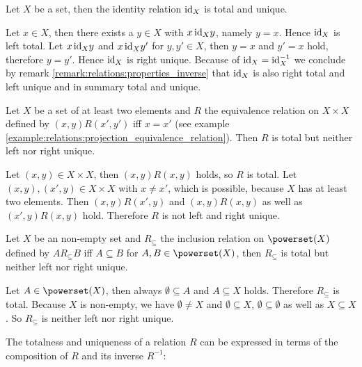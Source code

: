 \begin{examples}
    \begin{exampleenumerate}
        \item\label{example:relations:identity_relation_unique_total} Let $X$ be a set, then the identity relation $\text{id}_X$ is total and unique.
        \begin{miniproof}
            Let $x\in X$, then there exists a $y\in X$ with $x\,\text{id}_X y$, namely $y=x$. Hence $\text{id}_X$ is left total. Let $x\,\text{id}_X y$ and $x\,\text{id}_X y'$ for $y,y'\in X$, then $y=x$ and $y'=x$ hold, therefore $y=y'$. Hence $\text{id}_X$ is right unique. Because of $\text{id}_X=\text{id}_X^{-1}$ we conclude by remark \ref{remark:relations:properties_inverse} that $\text{id}_X$ is also right total and left unique and in summary total and unique.
        \end{miniproof}
        \item Let $X$ be a set of at least two elements and $R$ the equivalence relation on $X\times X$ defined by $(x,y)R(x',y')$ iff $x=x'$ (see example \ref{example:relations:projection_equivalence_relation}). Then $R$ is total but neither left nor right unique.
        \begin{miniproof}
            Let $(x,y)\in X\times X$, then $(x,y)R(x,y)$ holds, so $R$ is total. Let $(x,y),(x',y)\in X\times X$ with $x\neq x'$, which is possible, because $X$ has at least two elements. Then $(x,y)R(x',y)$ and $(x,y)R(x,y)$ as well as $(x',y)R(x,y)$ hold. Therefore $R$ is not left and right unique.
        \end{miniproof}
        \item Let $X$ be an non-empty set and $R_\subseteq$ the inclusion relation on $\powerset(X)$ defined by $A R_\subseteq B$ iff $A\subseteq B$ for $A,B\in\powerset(X)$, then $R_\subseteq$ is total but neither left nor right unique.
        \begin{miniproof}
            Let $A\in\powerset(X)$, then always $\emptyset\subseteq A$ and $A\subseteq X$ holds. Therefore $R_\subseteq$ is total. Because $X$ is non-empty, we have $\emptyset\neq X$ and $\emptyset\subseteq X$, $\emptyset\subseteq \emptyset$ as well as $X\subseteq X$. So $R_\subseteq$ is neither left nor right unique.
        \end{miniproof}
    \end{exampleenumerate}
\end{examples}

The totalness and uniqueness of a relation $R$ can be expressed in terms of the composition of $R$ and its inverse $R^{-1}$:

